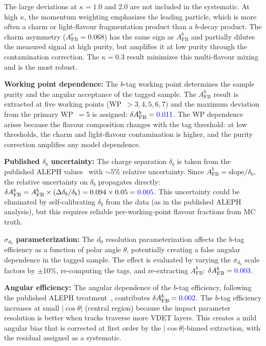 \documentclass[11pt,a4paper]{article}
\newcommand{\measured}[1]{\textcolor{blue}{#1}}
\begin{document}
The large deviations at $\kappa = 1.0$ and $2.0$ are not included in the
systematic.  At high $\kappa$, the momentum weighting emphasizes the
leading particle, which is more often a charm or light-flavour fragmentation
product than a $b$-decay product.  The charm asymmetry
($A_\mathrm{FB}^c = 0.068$) has the same sign as $A_\mathrm{FB}^b$
and partially dilutes the measured signal at high purity, but amplifies
it at low purity through the contamination correction.  The $\kappa = 0.3$
result minimizes this multi-flavour mixing and is the most robust.

\textbf{Working point dependence:}
The $b$-tag working point determines the sample purity and the angular
acceptance of the tagged sample.  The $A_\mathrm{FB}^b$ result is
extracted at five working points (WP~$> 3, 4, 5, 6, 7$) and the maximum
deviation from the primary WP~$= 5$ is assigned:
$\delta A_\mathrm{FB}^b = \measured{0.011}$.  The WP dependence arises
because the flavour composition changes with the tag threshold: at low
thresholds, the charm and light-flavour contamination is higher, and
the purity correction amplifies any model dependence.

\textbf{Published $\delta_b$ uncertainty:}
The charge separation $\delta_b$ is taken from the published ALEPH
values~\cite{LEP:EWWG:2005} with $\sim$5\% relative uncertainty.  Since
$A_\mathrm{FB}^b = \mathrm{slope}/\delta_b$, the relative uncertainty
on $\delta_b$ propagates directly: $\delta A_\mathrm{FB}^b =
A_\mathrm{FB}^b \times (\Delta\delta_b / \delta_b) = 0.094 \times 0.05 =
\measured{0.005}$.  This uncertainty could be eliminated by self-calibrating
$\delta_b$ from the data (as in the published ALEPH analysis), but this
requires reliable per-working-point flavour fractions from MC truth.

\textbf{$\sigma_{d_0}$ parameterization:}
The $d_0$ resolution parameterization affects the $b$-tag efficiency
as a function of polar angle $\theta$, potentially creating a false
angular dependence in the tagged sample.  The effect is evaluated by
varying the $\sigma_{d_0}$ scale factors by $\pm$10\%, re-computing the
tags, and re-extracting $A_\mathrm{FB}^b$:
$\delta A_\mathrm{FB}^b = \measured{0.003}$.

\textbf{Angular efficiency:}
The angular dependence of the $b$-tag efficiency, following the published
ALEPH treatment~\cite{LEP:EWWG:2005}, contributes
$\delta A_\mathrm{FB}^b = \measured{0.002}$.  The $b$-tag efficiency
increases at small $|\cos\theta|$ (central region) because the impact
parameter resolution is better when tracks traverse more VDET layers.
This creates a mild angular bias that is corrected at first order by
the $|\cos\theta|$-binned extraction, with the residual assigned as
a systematic.
\end{document}
